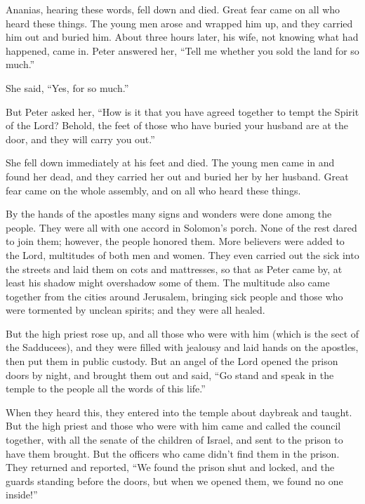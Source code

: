  Ananias, hearing these words, fell down and died. Great
fear came on all who heard these things.  The young men
arose and wrapped him up, and they carried him out and buried him.
 About three hours later, his wife, not knowing what had
happened, came in.  Peter answered her, ``Tell me whether
you sold the land for so much.''

She said, ``Yes, for so much.''

 But Peter asked her, ``How is it that you have agreed
together to tempt the Spirit of the Lord? Behold, the feet of those who
have buried your husband are at the door, and they will carry you out.''

 She fell down immediately at his feet and died. The
young men came in and found her dead, and they carried her out and
buried her by her husband.  Great fear came on the whole
assembly, and on all who heard these things.

 By the hands of the apostles many signs and wonders were
done among the people. They were all with one accord in Solomon's porch.
 None of the rest dared to join them; however, the people
honored them.  More believers were added to the Lord,
multitudes of both men and women.  They even carried out
the sick into the streets and laid them on cots and mattresses, so that
as Peter came by, at least his shadow might overshadow some of them.
 The multitude also came together from the cities around
Jerusalem, bringing sick people and those who were tormented by unclean
spirits; and they were all healed.

 But the high priest rose up, and all those who were with
him (which is the sect of the Sadducees), and they were filled with
jealousy  and laid hands on the apostles, then put them
in public custody.  But an angel of the Lord opened the
prison doors by night, and brought them out and said, 
``Go stand and speak in the temple to the people all the words of this
life.''

 When they heard this, they entered into the temple about
daybreak and taught. But the high priest and those who were with him
came and called the council together, with all the senate of the
children of Israel, and sent to the prison to have them brought.
 But the officers who came didn't find them in the
prison. They returned and reported,  ``We found the
prison shut and locked, and the guards standing before the doors, but
when we opened them, we found no one inside!''

